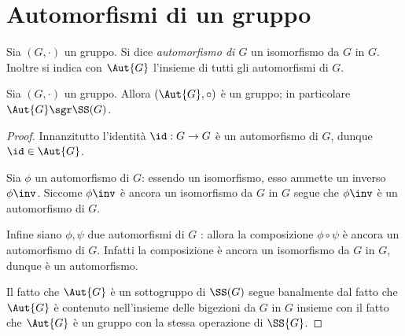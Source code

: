 \section{Automorfismi di un gruppo}

\begin{definition}
    [Automorfismo] Sia $(G, \cdot)$ un gruppo. Si dice \emph{automorfismo di $G$} un isomorfismo da $G$ in $G$.
    Inoltre si indica con $\Aut{G}$ l'insieme di tutti gli automorfismi di $G$.
\end{definition}

\begin{proposition}
     Sia $(G, \cdot)$ un gruppo. Allora $(\Aut{G}, \circ)$ è un gruppo;
    in particolare  $\Aut{G} \sgr \SS(G)$.
\end{proposition}
\begin{proof}
    Innanzitutto l'identità $\id : G \to G$ è un automorfismo di $G$, dunque $\id \in \Aut{G}$.

    Sia $\phi$ un automorfismo di $G$: essendo un isomorfismo, esso ammette un inverso $\phi\inv$. 
    Siccome $\phi\inv$ è ancora un isomorfismo da $G$ in $G$ segue che $\phi\inv$ è un automorfismo di $G$.

    Infine siano $\phi, \psi$ due automorfismi di $G$ : allora la composizione $\phi \circ \psi$ è ancora un automorfismo di $G$.
    Infatti la composizione è ancora un isomorfismo da $G$ in $G$, dunque è un automorfismo.

    Il fatto che $\Aut{G}$ è un sottogruppo di $\SS(G)$ segue banalmente dal fatto che 
    $\Aut{G}$ è contenuto nell'insieme delle bigezioni da $G$ in $G$ 
    insieme con il fatto che $\Aut{G}$ è un gruppo con la stessa operazione di $\SS{G}$.
\end{proof}
